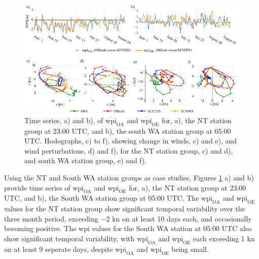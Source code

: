 \documentclass{ametsoc}
\begin{document}
\begin{figure}
\centering
\includegraphics[width=39pc]{case_studies.pdf}
\caption{Time series, a) and b), of $\overline{\text{wpi}}_\text{OA}$ and $\overline{\text{wpi}}_\text{OE}$ for, a), the NT station group at 23:00 UTC, and b), the south WA station group at 05:00 UTC. Hodographs, c) to f), showing change in winds, c) and e), and wind perturbations, d) and f), for the NT station group, c) and d), and south WA station group, e) and f).}
\label{Fig:case_studies}
\end{figure}

Using the NT and South WA station groups as case studies, Figures \ref{Fig:case_studies} a) and b) provide time series of $\text{wpi}_\text{OA}$ and $\text{wpi}_\text{OE}$ for, a), the NT station group at 23:00 UTC, and b), the South WA station group at 05:00 UTC. The $\text{wpi}_\text{OA}$ and $\text{wpi}_\text{OE}$ values for the NT station group show significant temporal variability over the three month period, exceeding $-2$ kn on at least 10 days each, and occasionally becoming positive. The $\text{wpi}$ values for the South WA station at 05:00 UTC also show significant temporal variability, with $\text{wpi}_\text{OA}$ and $\text{wpi}_\text{OE}$ each exceeding 1 kn on at least 9 seperate days, despite $\overline{\text{wpi}}_\text{OA}$ and $\overline{\text{wpi}}_\text{OE}$ being small. 
\end{document}
